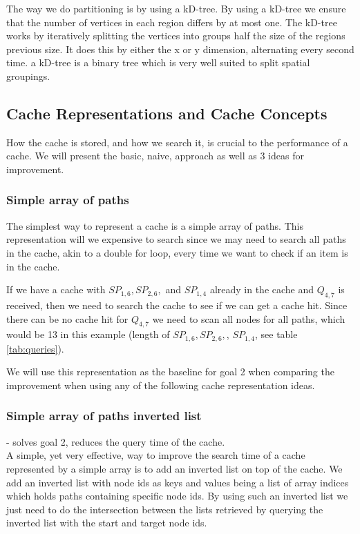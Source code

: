 The way we do partitioning is by using a kD-tree. By using a kD-tree we ensure that the number of vertices in each region differs by at most one. The kD-tree works by iteratively splitting the vertices into groups half the size of the regions previous size. It does this by either the x or y dimension, alternating every second time. a kD-tree is a binary tree which is very well suited to split spatial groupings.




\subsection{Cache Representations and Cache Concepts} \label{subsec:cacherepresentatons}
How the cache is stored, and how we search it, is crucial to the performance of a cache. We will present the basic, naive, approach as well as 3 ideas for improvement.
% 
\subsubsection{Simple array of paths}%
The simplest way to represent a cache is a simple array of paths. This representation will we expensive to search since we may need to search all paths in the cache, akin to a double for loop, every time we want to check if an item is in the cache.

If we have a cache with $SP_{1,6},SP_{2,6},$ and $SP_{1,4}$ already in the cache and $Q_{4,7}$ is received, then we need to search the cache to see if we can get a cache hit. Since there can be no cache hit for $Q_{4,7}$ we need to scan all nodes for all paths, which would be 13 in this example (length of $SP_{1,6},SP_{2,6},$, $SP_{1,4}$, see table \ref{tab:queries}).

We will use this representation as the baseline for goal 2 when comparing the improvement when using any of the following cache representation ideas.

\subsubsection{Simple array of paths inverted list} - solves goal 2, reduces the query time of the cache.\\
A simple, yet very effective, way to improve the search time of a cache represented by a simple array is to add an inverted list on top of the cache. We add an inverted list with node ids as keys and values being a list of array indices which holds paths containing specific node ids. By using such an inverted list we just need to do the intersection between the lists retrieved by querying the inverted list with the start and target node ids. 


